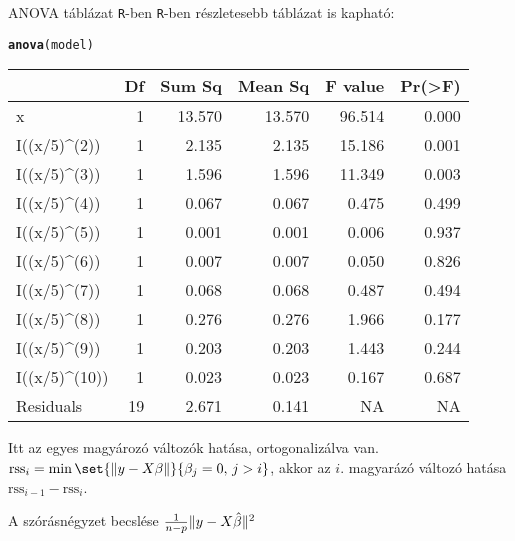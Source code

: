 \documentclass[aspectratio=169,notheorems,9pt,\option]{beamer}\usepackage[]{graphicx}\usepackage[]{color}
\makeatletter
\newcommand{\hlstd}[1]{\textcolor[rgb]{0.345,0.345,0.345}{#1}}%
\newcommand{\hlkwd}[1]{\textcolor[rgb]{0.737,0.353,0.396}{\textbf{#1}}}%
\newenvironment{kframe}{%
 \def\at@end@of@kframe{}%
 \ifinner\ifhmode%
  \def\at@end@of@kframe{\end{minipage}}%
  \begin{minipage}{\columnwidth}%
 \fi\fi%
 \def\FrameCommand##1{\hskip\@totalleftmargin \hskip-\fboxsep
 \colorbox{shadecolor}{##1}\hskip-\fboxsep
     \hskip-\linewidth \hskip-\@totalleftmargin \hskip\columnwidth}%
 \MakeFramed {\advance\hsize-\width
   \@totalleftmargin\z@ \linewidth\hsize
   \@setminipage}}%
 {\par\unskip\endMakeFramed%
 \at@end@of@kframe}
\newenvironment{knitrout}{}{} %
\makeatother
\begin{document}
\begin{frame}{ANOVA táblázat \texttt{R}-ben}
  \texttt{R}-ben részletesebb táblázat is kapható:
\begin{knitrout}
\color{fgcolor}\begin{kframe}
\begin{alltt}
\hlkwd{anova}\hlstd{(model)}
\end{alltt}
\end{kframe}
\end{knitrout}
\begin{knitrout}
\color{fgcolor}
\begin{tabular}{l|r|r|r|r|r}
\hline
  & Df & Sum Sq & Mean Sq & F value & Pr(>F)\\
\hline
x & 1 & 13.570 & 13.570 & 96.514 & 0.000\\
\hline
I((x/5)\textasciicircum{}(2)) & 1 & 2.135 & 2.135 & 15.186 & 0.001\\
\hline
I((x/5)\textasciicircum{}(3)) & 1 & 1.596 & 1.596 & 11.349 & 0.003\\
\hline
I((x/5)\textasciicircum{}(4)) & 1 & 0.067 & 0.067 & 0.475 & 0.499\\
\hline
I((x/5)\textasciicircum{}(5)) & 1 & 0.001 & 0.001 & 0.006 & 0.937\\
\hline
I((x/5)\textasciicircum{}(6)) & 1 & 0.007 & 0.007 & 0.050 & 0.826\\
\hline
I((x/5)\textasciicircum{}(7)) & 1 & 0.068 & 0.068 & 0.487 & 0.494\\
\hline
I((x/5)\textasciicircum{}(8)) & 1 & 0.276 & 0.276 & 1.966 & 0.177\\
\hline
I((x/5)\textasciicircum{}(9)) & 1 & 0.203 & 0.203 & 1.443 & 0.244\\
\hline
I((x/5)\textasciicircum{}(10)) & 1 & 0.023 & 0.023 & 0.167 & 0.687\\
\hline
Residuals & 19 & 2.671 & 0.141 & NA & NA\\
\hline
\end{tabular}

\end{knitrout}
  
  Itt az egyes magyározó változók hatása, ortogonalizálva van. 
  $\text{rss}_i=\min\set{\norm{y-X\beta}}{\beta_{j}=0,\,j>i}$, 
  akkor az $i$. magyarázó változó hatása $\text{rss}_{i-1}-\text{rss}_{i}$.
  
  A szórásnégyzet becslése $\frac{1}{n-p}\lVert y-X\hat\beta\rVert^2$ 
  
\end{frame}
\end{document}
